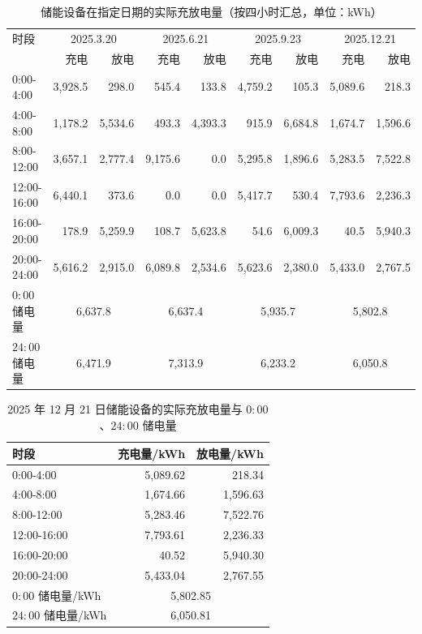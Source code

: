 \begin{table}[htbp]
  \centering
  \caption{储能设备在指定日期的实际充放电量（按四小时汇总，单位：kWh）}
  \label{tab:p3-storage}
  \scriptsize
  \begin{tabular}{lrrrrrrrr}
    \toprule
    时段 & \multicolumn{2}{c}{2025.3.20} & \multicolumn{2}{c}{2025.6.21} & \multicolumn{2}{c}{2025.9.23} & \multicolumn{2}{c}{2025.12.21} \\
     & 充电 & 放电 & 充电 & 放电 & 充电 & 放电 & 充电 & 放电 \\
    \midrule
    0{:}00-4{:}00 & 3,928.5 & 298.0 & 545.4 & 133.8 & 4,759.2 & 105.3 & 5,089.6 & 218.3 \\
    4{:}00-8{:}00 & 1,178.2 & 5,534.6 & 493.3 & 4,393.3 & 915.9 & 6,684.8 & 1,674.7 & 1,596.6 \\
    8{:}00-12{:}00 & 3,657.1 & 2,777.4 & 9,175.6 & 0.0 & 5,295.8 & 1,896.6 & 5,283.5 & 7,522.8 \\
    12{:}00-16{:}00 & 6,440.1 & 373.6 & 0.0 & 0.0 & 5,417.7 & 530.4 & 7,793.6 & 2,236.3 \\
    16{:}00-20{:}00 & 178.9 & 5,259.9 & 108.7 & 5,623.8 & 54.6 & 6,009.3 & 40.5 & 5,940.3 \\
    20{:}00-24{:}00 & 5,616.2 & 2,915.0 & 6,089.8 & 2,534.6 & 5,623.6 & 2,380.0 & 5,433.0 & 2,767.5 \\
    \midrule
    $0{:}00$ 储电量 & \multicolumn{2}{c}{6,637.8} & \multicolumn{2}{c}{6,637.4} & \multicolumn{2}{c}{5,935.7} & \multicolumn{2}{c}{5,802.8} \\
    $24{:}00$ 储电量 & \multicolumn{2}{c}{6,471.9} & \multicolumn{2}{c}{7,313.9} & \multicolumn{2}{c}{6,233.2} & \multicolumn{2}{c}{6,050.8} \\
    \bottomrule
  \end{tabular}
\end{table}

\begin{table}[htbp]
  \centering
  \caption{2025 年 12 月 21 日储能设备的实际充放电量与 $0{:}00$、$24{:}00$ 储电量}
  \label{tab:p3-storage-dec}
  \footnotesize
  \begin{tabular}{lrr}
    \toprule
    时段 & 充电量/kWh & 放电量/kWh \\
    \midrule
    0{:}00-4{:}00 & 5,089.62 & 218.34 \\
    4{:}00-8{:}00 & 1,674.66 & 1,596.63 \\
    8{:}00-12{:}00 & 5,283.46 & 7,522.76 \\
    12{:}00-16{:}00 & 7,793.61 & 2,236.33 \\
    16{:}00-20{:}00 & 40.52 & 5,940.30 \\
    20{:}00-24{:}00 & 5,433.04 & 2,767.55 \\
    \midrule
    $0{:}00$ 储电量/kWh & \multicolumn{2}{c}{5,802.85} \\
    $24{:}00$ 储电量/kWh & \multicolumn{2}{c}{6,050.81} \\
    \bottomrule
  \end{tabular}
\end{table}

